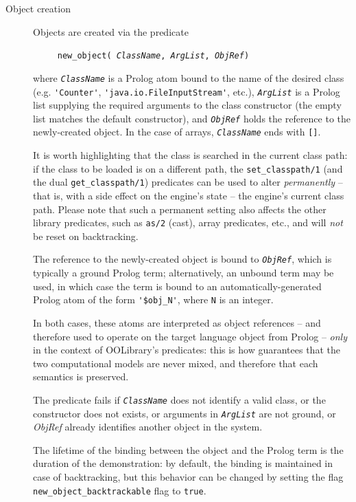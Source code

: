 \begin{description}
  \item [Object creation]
        Objects are created via the predicate

        \texttt{~~~~~new\_object(%
                 \textit{ClassName}, \textit{ArgList}, \textit{ObjRef})} %

        where \texttt{\textit{ClassName}} is a Prolog atom bound to the name of the
        desired class (e.g. \verb|'Counter'|, \verb|'java.io.FileInputStream'|, etc.), \texttt{\textit{ArgList}} is a Prolog list supplying the required arguments to the class constructor (the empty list matches the default constructor), and \texttt{\textit{ObjRef}} holds the reference to the newly-created object.
        In the case of arrays, \texttt{\textit{ClassName}} ends with \texttt{[]}.

        It is worth highlighting that the class is searched in the current class path: if the class to be loaded is on a different path,
        the \texttt{set\_classpath/1} (and the dual \texttt{get\_classpath/1}) predicates can be used to alter \emph{permanently} -- that
        is, with a side effect on the engine's state -- the engine's current class path.
        Please note that such a permanent setting also affects the other library predicates, such as \texttt{as/2} (cast),
        array predicates, etc., and will \emph{not} be reset on backtracking.

        The reference to the newly-created object is bound to \texttt{\textit{ObjRef}},
        which is typically a ground Prolog term; alternatively, an unbound term
        may be used, in which case the term is bound to an automatically-generated
        Prolog atom of the form \verb|'$obj_N'|, where \texttt{N} is an integer.

        In both cases, these atoms are interpreted as object references --
        and therefore used to operate on the target language object from Prolog -- \textit{only} in the context of OOLibrary's predicates: this is how \tuprolog{} guarantees that the two computational models are never mixed, and therefore that each semantics is preserved.

        The predicate fails if \texttt{\textit{ClassName}} does not identify a valid class, or the constructor does not exists, or arguments in \texttt{\textit{ArgList}} are not ground, or \textit{ObjRef} already identifies another object in the system.

        The lifetime of the binding between the object and the Prolog term
        is the duration of the demonstration: by default, the binding is maintained in case of backtracking, but this behavior can be changed by setting the flag \texttt{new\_object\_backtrackable} flag to \texttt{true}.


\end{description}
